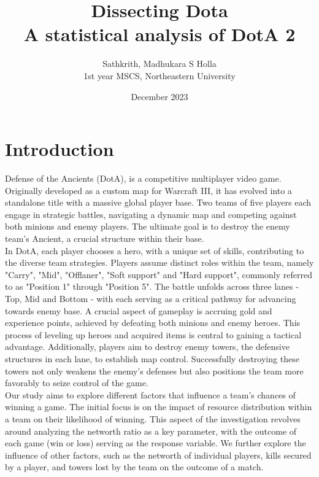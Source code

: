 \documentclass[11pt]{article}
\title{Dissecting Dota \\[\baselineskip] \large A statistical analysis of DotA 2}
\author{
    Sathkrith, Madhukara S Holla
    \\
    1st year MSCS, Northeastern University
}
\date{December 2023}
\begin{document}
\maketitle
\newpage

\section{Introduction}
Defense of the Ancients (DotA), is a competitive multiplayer video game.
Originally developed as a custom map for Warcraft III, it has evolved into a
standalone title with a massive global player base. Two teams of five players
each engage in strategic battles, navigating a dynamic map and competing against
both minions and enemy players. The ultimate goal is to destroy the enemy
team's Ancient, a crucial structure within their base.
\\

In DotA, each player chooses a hero, with a unique set of skills, contributing
to the diverse team strategies. Players assume distinct roles within the team,
namely "Carry", "Mid", "Offlaner", "Soft support" and "Hard support", commonly
referred to as "Position 1" through "Position 5". The battle unfolds across
three lanes - Top, Mid and Bottom - with each serving as a critical pathway
for advancing towards enemy base. A crucial aspect of gameplay is accruing
gold and experience points, achieved by defeating both minions and enemy heroes.
This process of leveling up heroes and acquired items is central to gaining a
tactical advantage. Additionally, players aim to destroy enemy towers, the
defensive structures in each lane, to establish map control. Successfully
destroying these towers not only weakens the enemy's defenses but also positions
the team more favorably to seize control of the game.
\\

Our study aims to explore different factors that influence a team's chances of
winning a game. The initial focus is on the impact of resource distribution
within a team on their likelihood of winning. This aspect of the investigation
revolves around analyzing the networth ratio as a key parameter, with the
outcome of each game (win or loss) serving as the response variable.
We further explore the influence of other factors, such as the networth of
individual players, kills secured by a player, and towers lost by the team on
the outcome of a match.
\end{document}
